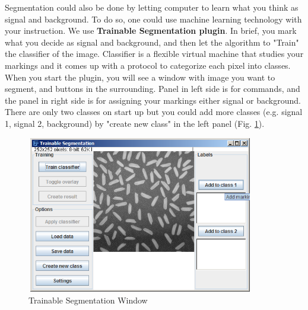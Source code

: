 Segmentation could also be done by letting computer to learn what you
think as signal and background. To do so, one could use machine
learning technology with your instruction. We use
\textbf{Trainable Segmentation plugin}.
In brief, you mark what you decide as signal and background, and then
let the algorithm to "Train" the
classifier of the image. Classifier is a flexible virtual machine
that studies your markings and it comes up with a protocol to
categorize each pixel into classes. 
When you start the plugin, you
will see a window with image you want to segment, and buttons in the
surrounding. Panel in left side is for commands, and the panel in right
side is for assigning your markings either signal or background. There
are only two classes on start up but you could add more classes (e.g.
signal 1, signal 2, background) by "create new
class" in the left panel (Fig. \ref{fig:img121}). 
\begin{figure}[H]
\begin{center}
\includegraphics[width=9.947cm,height=6.872cm]{img/CMCIBasicCourse201102-img121.png}
\caption{ Trainable Segmentation Window}
\label{fig:img121}
\end{center}
\end{figure}

